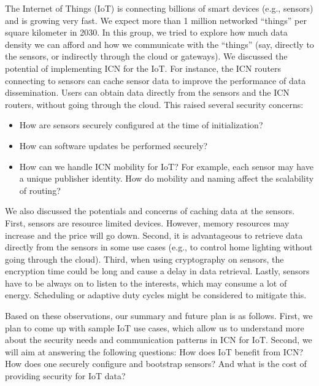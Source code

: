 \documentclass[a4paper,UKenglish]{dagrep}
\begin{document}
\license

The Internet of Things (IoT) is connecting billions of smart devices (e.g., sensors) and is growing very fast. We expect more than 1 million networked ``things'' per square kilometer in 2030. In this group, we tried to explore how much data density we can afford
and how we communicate with the ``things'' (say, directly to the sensors, or indirectly through the cloud or gateways). We discussed the potential of implementing ICN for the IoT. For instance, the ICN routers connecting to sensors can cache sensor data to improve the performance of data dissemination. Users can obtain data directly from the sensors and the ICN routers, without going through the cloud. This raised several security concerns:

\begin{itemize}
\item How are sensors securely configured at the time of initialization?
\item How can software updates be performed securely?
\item How can we handle ICN mobility for IoT? For example, each sensor may have a unique publisher identity. How do mobility and naming affect the scalability of routing?
\end{itemize}

We also discussed the potentials and concerns of caching data at the sensors. First, sensors are resource limited devices. However, memory resources may increase and the price will go down. Second, it is advantageous to retrieve data directly from the sensors in some use cases (e.g., to control home lighting without going through the cloud). Third, when using cryptography on sensors, the encryption time could be long and cause a delay in data retrieval. Lastly, sensors have to be always on to listen to the interests, which may consume a lot of energy. Scheduling or adaptive duty cycles might be considered to mitigate this.

Based on these observations, our summary and future plan is as follows. First, we plan to come up with sample IoT use cases, which allow us to understand more about the security needs and communication patterns in ICN for IoT. Second, we will aim at answering the following questions: How does IoT benefit from ICN? How does one securely configure and bootstrap sensors? And what is the cost of providing security for IoT data?
\end{document}
